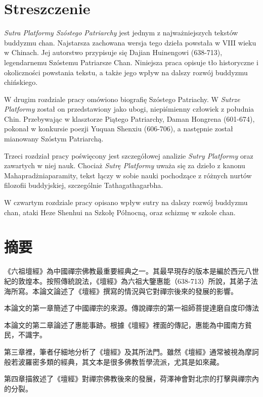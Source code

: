 \makeatletter
\@openrightfalse
\makeatother
\chapter*{Streszczenie}
\textit{Sutra Platformy Szóstego Patriarchy} jest jednym z najważniejszych tekstów buddyzmu chan.
Najstarsza zachowana wersja tego dzieła powstała w VIII wieku w Chinach.
Jej autorstwo przypisuje się Dajian Huinengowi (638-713), legendarnemu Szóstemu Patriarsze Chan.
Niniejsza praca opisuje tło historyczne i okoliczności powstania tekstu, a także jego wpływ na dalszy rozwój buddyzmu chińskiego.

W drugim rozdziale pracy omówiono biografię Szóstego Patriachy.
W \textit{Sutrze Platformy} został on przedstawiony jako ubogi, niepiśmienny człowiek z południa Chin.
Przebywając w klasztorze Piątego Patriarchy, Daman Hongrena (601-674), pokonał w konkursie poezji Yuquan Shenxiu (606-706), a następnie został mianowany Szóstym Patriarchą.

Trzeci rozdział pracy poświęcony jest szczegółowej analizie \textit{Sutry Platformy} oraz zawartych w niej nauk.
Chociaż \textit{Sutrę Platformy} uważa się za dzieło z kanonu Mahapradżniaparamity, tekst łączy w sobie nauki pochodzące z różnych nurtów filozofii buddyjskiej, szczególnie Tathagathagarbha.

W czwartym rozdziale pracy opisano wpływ sutry na dalszy rozwój buddyzmu chan, ataki Heze Shenhui na Szkołę Północną, oraz schizmę w szkole chan.

\chapter*{摘要}
《六祖壇經》為中國禪宗佛教最重要經典之一。其最早現存的版本是編於西元八世紀的敦煌本。按照傳統說法，《壇經》為六祖大鑒惠能（638-713）所說，其弟子法海所寫。本論文論述了《壇經》撰寫的情況與它對禪宗後來的發展的影響。

本論文的第一章簡述了中國禪宗的來源。傳說禪宗的第一祖師菩提達磨自度印傳法

本論文的第二章論述了惠能事跡。根據《壇經》裡面的傳記，惠能為中國南方貧民，不識字。

第三章裡，筆者仔細地分析了《壇經》及其所法門。雖然《壇經》通常被視為摩訶般若波羅密多類的經典，其文本是很多佛教哲學流派，尤其是如來藏。

第四章描敘述了《壇經》對禪宗佛教後來的發展，荷澤神會對北宗的打擊與禪宗內的分裂。


